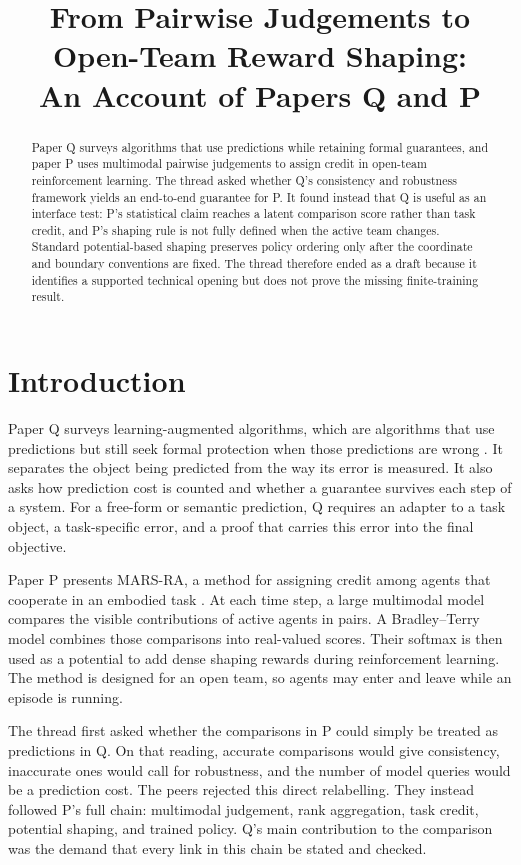 \documentclass{article}
\title{From Pairwise Judgements to Open-Team Reward Shaping:\\An Account of Papers Q and P}
\author{}
\date{}
\begin{document}
\maketitle

\begin{abstract}
Paper Q surveys algorithms that use predictions while retaining formal guarantees, and paper P uses multimodal pairwise judgements to assign credit in open-team reinforcement learning.  The thread asked whether Q's consistency and robustness framework yields an end-to-end guarantee for P.  It found instead that Q is useful as an interface test: P's statistical claim reaches a latent comparison score rather than task credit, and P's shaping rule is not fully defined when the active team changes.  Standard potential-based shaping preserves policy ordering only after the coordinate and boundary conventions are fixed.  The thread therefore ended as a draft because it identifies a supported technical opening but does not prove the missing finite-training result.
\end{abstract}

\section{Introduction}

Paper Q surveys learning-augmented algorithms, which are algorithms that use predictions but still seek formal protection when those predictions are wrong \cite{Q}.  It separates the object being predicted from the way its error is measured.  It also asks how prediction cost is counted and whether a guarantee survives each step of a system.  For a free-form or semantic prediction, Q requires an adapter to a task object, a task-specific error, and a proof that carries this error into the final objective.

Paper P presents MARS-RA, a method for assigning credit among agents that cooperate in an embodied task \cite{P}.  At each time step, a large multimodal model compares the visible contributions of active agents in pairs.  A Bradley--Terry model combines those comparisons into real-valued scores.  Their softmax is then used as a potential to add dense shaping rewards during reinforcement learning.  The method is designed for an open team, so agents may enter and leave while an episode is running.

The thread first asked whether the comparisons in P could simply be treated as predictions in Q.  On that reading, accurate comparisons would give consistency, inaccurate ones would call for robustness, and the number of model queries would be a prediction cost.  The peers rejected this direct relabelling.  They instead followed P's full chain: multimodal judgement, rank aggregation, task credit, potential shaping, and trained policy.  Q's main contribution to the comparison was the demand that every link in this chain be stated and checked.
\end{document}
